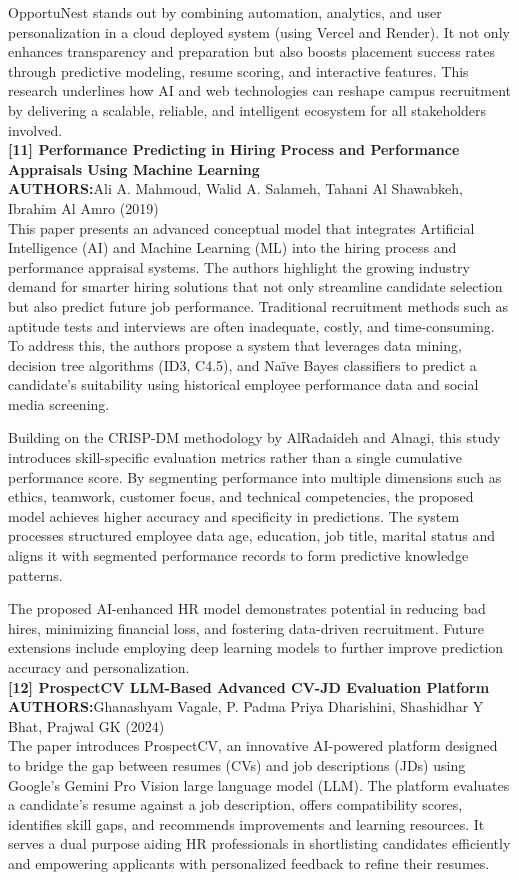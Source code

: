 \documentclass[a4paper, 12pt]{report}
\begin{document}
OpportuNest stands out by combining automation, analytics, and user personalization in a cloud deployed system (using Vercel and Render). It not only enhances transparency and preparation but also boosts placement success rates through predictive modeling, resume scoring, and interactive features. This research underlines how AI and web technologies can reshape campus recruitment by delivering a scalable, reliable, and intelligent ecosystem for all stakeholders involved.\\
\noindent\textbf{[11] Performance Predicting in Hiring Process and Performance Appraisals Using Machine Learning}\\
\textbf{AUTHORS:}Ali A. Mahmoud, Walid A. Salameh, Tahani Al Shawabkeh, Ibrahim Al Amro (2019)\\
This paper presents an advanced conceptual model that integrates Artificial Intelligence (AI) and Machine Learning (ML) into the hiring process and performance appraisal systems. The authors highlight the growing industry demand for smarter hiring solutions that not only streamline candidate selection but also predict future job performance. Traditional recruitment methods such as aptitude tests and interviews are often inadequate, costly, and time-consuming. To address this, the authors propose a system that leverages data mining, decision tree algorithms (ID3, C4.5), and Naïve Bayes classifiers to predict a candidate’s suitability using historical employee performance data and social media screening.

Building on the CRISP-DM methodology by AlRadaideh and Alnagi, this study introduces skill-specific evaluation metrics rather than a single cumulative performance score. By segmenting performance into multiple dimensions such as ethics, teamwork, customer focus, and technical competencies, the proposed model achieves higher accuracy and specificity in predictions. The system processes structured employee data age, education, job title, marital status and aligns it with segmented performance records to form predictive knowledge patterns.

The proposed AI-enhanced HR model demonstrates potential in reducing bad hires, minimizing financial loss, and fostering data-driven recruitment. Future extensions include employing deep learning models to further improve prediction accuracy and personalization.\\
\noindent\textbf{[12] ProspectCV LLM-Based Advanced CV-JD Evaluation Platform}\\
\textbf{AUTHORS:}Ghanashyam Vagale, P. Padma Priya Dharishini, Shashidhar Y Bhat, Prajwal GK (2024)\\
The paper introduces ProspectCV, an innovative AI-powered platform designed to bridge the gap between resumes (CVs) and job descriptions (JDs) using Google’s Gemini Pro Vision large language model (LLM). The platform evaluates a candidate’s resume against a job description, offers compatibility scores, identifies skill gaps, and recommends improvements and learning resources. It serves a dual purpose aiding HR professionals in shortlisting candidates efficiently and empowering applicants with personalized feedback to refine their resumes.
\end{document}
